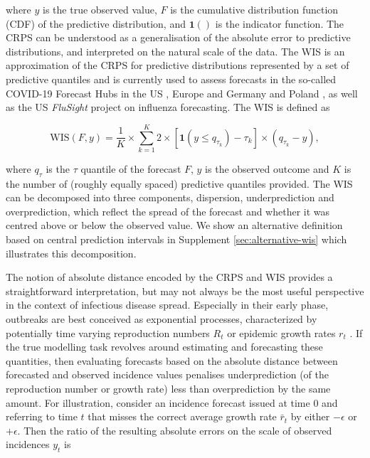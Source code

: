 \documentclass[10pt,letterpaper]{article}
\begin{document}
where $y$ is the true observed value, $F$ is the cumulative distribution function (CDF) of the predictive distribution, and $\boldsymbol{1}()$ is the indicator function. The CRPS can be understood as a generalisation of the absolute error to predictive distributions, and interpreted on the natural scale of the data. The WIS is an approximation of the CRPS for predictive distributions represented by a set of predictive quantiles and is currently used to assess forecasts in the so-called COVID-19 Forecast Hubs in the US \cite{cramerCOVID19ForecastHub2020, cramerEvaluationIndividualEnsemble2021}, Europe \cite{sherrattPredictivePerformanceMultimodel2022} and Germany and Poland \cite{bracherShorttermForecastingCOVID192021, bracherNationalSubnationalShortterm2021}, as well as the US \textit{FluSight} project on influenza forecasting\cite{CdcepiFlusightforecastdata2022}. The WIS is defined as 
\begin{linenomath*}
\begin{equation}
    \text{WIS}(F, y) = \frac{1}{K} \times \sum_{k = 1}^{K} 2 \times \left[ \boldsymbol{1}(y \leq q_{\tau_k}) - \tau_k \right] \times ( q_{\tau_k} - y), 
\end{equation}
\end{linenomath*}
where $q_{\tau}$ is the $\tau$ quantile of the forecast $F$, $y$ is the observed outcome and $K$ is the number of (roughly equally spaced) predictive quantiles provided. The WIS can be decomposed into three components, dispersion, underprediction and overprediction, which reflect the spread of the forecast and whether it was centred above or below the observed value. We show an alternative definition based on central prediction intervals in Supplement \ref{sec:alternative-wis} which illustrates this decomposition. 

The notion of absolute distance encoded by the CRPS and WIS provides a straightforward interpretation, but may not always be the most useful perspective in the context of infectious disease spread. Especially in their early phase, outbreaks are best conceived as exponential processes, characterized by potentially time varying reproduction numbers $R_t$ \cite{gosticPracticalConsiderationsMeasuring2020} or epidemic growth rates $r_t$ \cite{dushoffSpeedStrengthEpidemic2021}. If the true modelling task revolves around estimating and forecasting these quantities, then evaluating forecasts based on the absolute distance between forecasted and observed incidence values penalises underprediction (of the reproduction number or growth rate) less than overprediction by the same amount. For illustration, consider an incidence forecast issued at time 0 and referring to time $t$ that misses the correct average growth rate $\bar{r}_t$ by either $-\epsilon$ or $+\epsilon$. Then the ratio of the resulting absolute errors on the scale of observed incidences $y_{t}$ is
\end{document}
